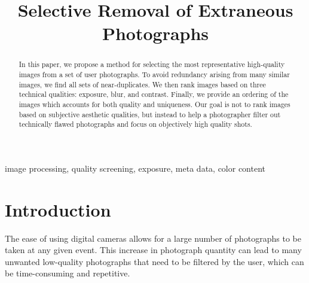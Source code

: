 \documentclass{article}
\begin{document}
\sloppy
\topmargin=0mm			


\title{
Selective Removal of Extraneous Photographs
}

\address{}

\maketitle	
\begin{abstract}
In this paper, we propose a method for selecting the most representative high-quality images from a set of user photographs. To avoid redundancy arising from many similar images, we find all sets of near-duplicates. We then rank images based on three technical qualities: exposure, blur, and contrast. Finally, we provide an ordering of the images which accounts for both quality and uniqueness. Our goal is not to rank images based on subjective aesthetic qualities, but instead to help a photographer filter out technically flawed photographs and focus on objectively high quality shots.
\end{abstract}	

\begin{keywords}
image processing, quality screening, exposure, meta data, color content  %
\end{keywords}

\section{Introduction}
\label{sec:intro}

The ease of using digital cameras allows for a large number of photographs to be taken at any given event. This increase in photograph quantity can lead to many unwanted low-quality photographs that need to be filtered by the user, which can be time-consuming and repetitive.
\end{document}
